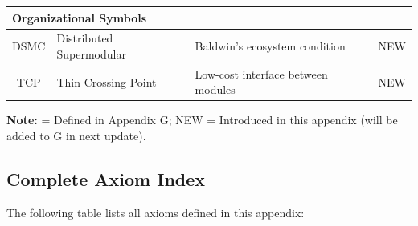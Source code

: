 \begin{longtable}{@{}clp{6cm}c@{}}
\multicolumn{4}{l}{\textbf{Organizational Symbols}} \\
\midrule
DSMC & Distributed Supermodular & Baldwin's ecosystem condition & NEW \\
TCP & Thin Crossing Point & Low-cost interface between modules & NEW \\

\end{longtable}

\textbf{Note:} \checkmark = Defined in Appendix G; NEW = Introduced in this appendix 
(will be added to G in next update).



\subsection{Complete Axiom Index}
\label{sec:B-axiom-index}

The following table lists all axioms defined in this appendix:

